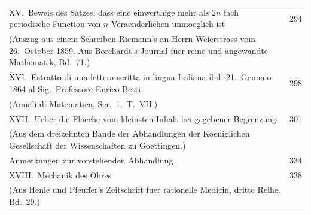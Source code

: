 \documentclass[11pt,a4paper]{article}
\theoremstyle{plain}
\theoremstyle{definition}
\begin{document}
\begin{longtable}{p{12cm}r}
XV.\ Beweis des Satzes, dass eine einwerthige mehr als $2n$ fach periodische Function von $n$ Veraenderlichen unmoeglich ist & 294\\
\quad (Auszug aus einem Schreiben Riemann's an Herrn Weierstrass vom 26.\ October 1859. Aus Borchardt's Journal fuer reine und angewandte Mathematik, Bd.\ 71.)\\[0.5em]

XVI.\ Estratto di una lettera scritta in lingua Italiana il di 21.\ Gennaio 1864 al Sig.\ Professore Enrico Betti & 298\\
\quad (Annali di Matematica, Ser.\ 1.\ T.\ VII.)\\[0.5em]

XVII.\ Ueber die Flaeche vom kleinsten Inhalt bei gegebener Begrenzung & 301\\
\quad (Aus dem dreizehnten Bande der Abhandlungen der Koeniglichen Gesellschaft der Wissenschaften zu Goettingen.)\\
\quad Anmerkungen zur vorstehenden Abhandlung & 334\\[0.5em]

XVIII.\ Mechanik des Ohres & 338\\
\quad (Aus Henle und Pfeuffer's Zeitschrift fuer rationelle Medicin, dritte Reihe. Bd.\ 29.)\\
\end{longtable}

\clearpage
\end{document}
